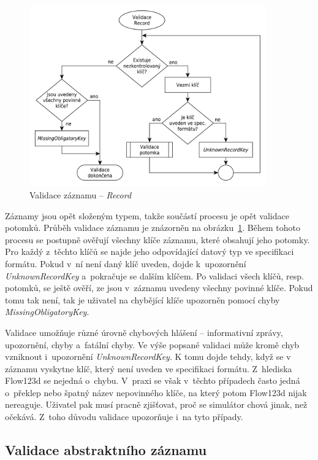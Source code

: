 \documentclass[FM,bw,DP]{tulthesis}
\begin{document}
\begin{figure}[h]
	\centering
    \includegraphics[width=0.91\textwidth]{../img/validation_record.pdf}
    \caption{Validace záznamu -- \textit{Record}}
	\label{img:validation_record}
\end{figure}

Záznamy jsou opět složeným typem, takže součástí procesu je opět validace potomků. Průběh validace záznamu je znázorněn na obrázku~\ref{img:validation_record}. Během tohoto procesu se postupně ověřují všechny klíče záznamu, které obsahují jeho potomky. Pro každý z~těchto klíčů se najde jeho odpovídající datový typ ve specifikaci formátu. Pokud v~ní není daný klíč uveden, dojde k~upozornění \textit{UnknownRecordKey} a~pokračuje se dalším klíčem. Po validaci všech klíčů, resp. potomků, se ještě ověří, ze jsou v~záznamu uvedeny všechny povinné klíče. Pokud tomu tak není, tak je uživatel na chybějící klíče upozorněn pomocí chyby \textit{MissingObligatoryKey}.

Validace umožňuje různé úrovně chybových hlášení -- informativní zprávy, upozornění, chyby a~fatální chyby. Ve výše popsané validaci může kromě chyb vzniknout i~upozornění \textit{UnknownRecordKey}. K tomu dojde tehdy, když se v záznamu vyskytne klíč, který není uveden ve specifikaci formátu. Z~hlediska Flow123d se nejedná o~chybu. V~praxi se však v~těchto případech často jedná o~překlep nebo špatný název nepovinného klíče, na který potom Flow123d nijak nereaguje. Uživatel pak musí pracně zjišťovat, proč se simulátor chová jinak, než očekává. Z~toho důvodu validace upozorňuje i~na tyto případy.

\subsection{Validace abstraktního záznamu}
\end{document}
